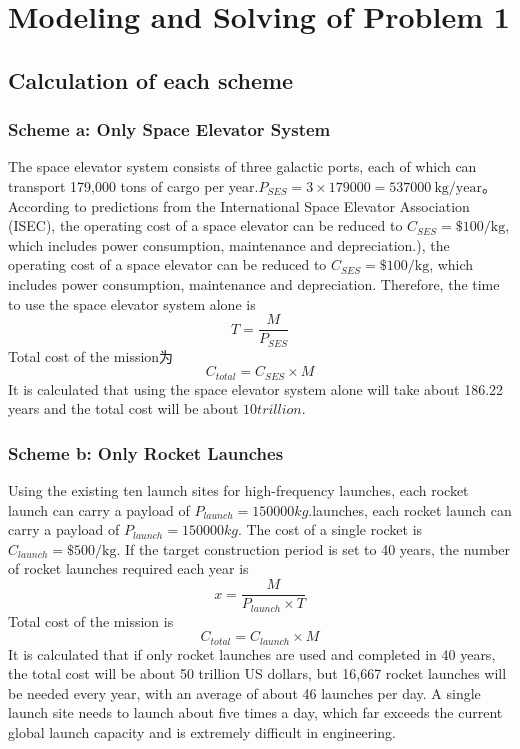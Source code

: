 \newpage %

\section{Modeling and Solving of Problem 1}

\subsection{Calculation of each scheme}
\subsubsection{Scheme a: Only Space Elevator System}
\vspace{0.3em}
The space elevator system consists of three galactic ports, each of which can transport 179,000 tons of cargo per year.$P_{SES} = 3 \times 179000 = 537000\ \mathrm{kg/year}$。
According to predictions from the International Space Elevator Association (ISEC), the operating cost of a space elevator can be reduced to $C_{SES} = \$100/\mathrm{kg}$, which includes power consumption, maintenance and depreciation.), the operating cost of a space elevator can be reduced to $C_{SES} = \$100/\mathrm{kg}$, which includes power consumption, maintenance and depreciation.
Therefore, the time to use the space elevator system alone is
\[T=\frac{M}{P_{SES}}\]
Total cost of the mission为
\[C_{total} = C_{SES} \times M \]
\indent It is calculated that using the space elevator system alone will take about 186.22 years and the total cost will be about $10 trillion$.

\subsubsection{Scheme b: Only Rocket Launches}
\vspace{0.3em}
Using the existing ten launch sites for high-frequency launches, each rocket launch can carry a payload of $P_{launch} = 150000kg$.launches, each rocket launch can carry a payload of $P_{launch} = 150000kg$.
The cost of a single rocket is $C_{launch} = \$500/\mathrm{kg}$.
If the target construction period is set to 40 years, the number of rocket launches required each year is
\[x = \frac{M}{P_{launch} \times T} \]
Total cost of the mission is
\[C_{total} = C_{launch} \times M \]
\indent It is calculated that if only rocket launches are used and completed in 40 years, the total cost will be about 50 trillion US dollars, but 16,667 rocket launches will be needed every year, with an average of about 46 launches per day. 
A single launch site needs to launch about five times a day, which far exceeds the current global launch capacity and is extremely difficult in engineering.

